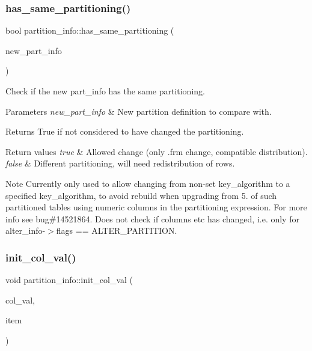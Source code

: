 \subsubsection{\texorpdfstring{has\+\_\+same\+\_\+partitioning()}{has\_same\_partitioning()}}
{\footnotesize\ttfamily bool partition\+\_\+info\+::has\+\_\+same\+\_\+partitioning (\begin{DoxyParamCaption}\item[{\mbox{\hyperlink{classpartition__info}{partition\+\_\+info}} $\ast$}]{new\+\_\+part\+\_\+info }\end{DoxyParamCaption})}

Check if the new part\+\_\+info has the same partitioning.


\begin{DoxyParams}{Parameters}
{\em new\+\_\+part\+\_\+info} & New partition definition to compare with.\\
\hline
\end{DoxyParams}
\begin{DoxyReturn}{Returns}
True if not considered to have changed the partitioning. 
\end{DoxyReturn}

\begin{DoxyRetVals}{Return values}
{\em true} & Allowed change (only .frm change, compatible distribution). \\
\hline
{\em false} & Different partitioning, will need redistribution of rows.\\
\hline
\end{DoxyRetVals}
\begin{DoxyNote}{Note}
Currently only used to allow changing from non-\/set key\+\_\+algorithm to a specified key\+\_\+algorithm, to avoid rebuild when upgrading from 5. of such partitioned tables using numeric columns in the partitioning expression. For more info see bug\#14521864. Does not check if columns etc has changed, i.\+e. only for alter\+\_\+info-\/$>$flags == A\+L\+T\+E\+R\+\_\+\+P\+A\+R\+T\+I\+T\+I\+ON. 
\end{DoxyNote}
\mbox{\label{classpartition__info_a913eddd328bcead14cf7417076dcf66b}} 
\subsubsection{\texorpdfstring{init\+\_\+col\+\_\+val()}{init\_col\_val()}}
{\footnotesize\ttfamily void partition\+\_\+info\+::init\+\_\+col\+\_\+val (\begin{DoxyParamCaption}\item[{\mbox{\hyperlink{structp__column__list__val}{part\+\_\+column\+\_\+list\+\_\+val}} $\ast$}]{col\+\_\+val,  }\item[{\mbox{\hyperlink{classItem}{Item}} $\ast$}]{item }\end{DoxyParamCaption})}

